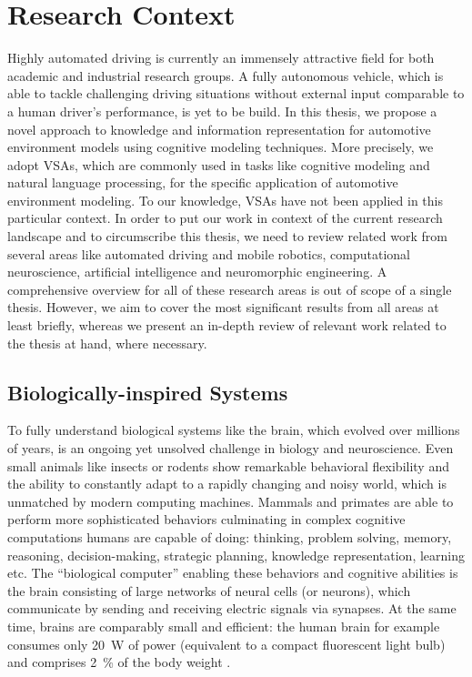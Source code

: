 \chapter{Research Context}%
\label{chap:research_context}

Highly automated driving is currently an immensely attractive field for both academic and industrial research groups.
A fully autonomous vehicle, which is able to tackle challenging driving situations without external input comparable to a human driver's performance, is yet to be build.
In this thesis, we propose a novel approach to knowledge and information representation for automotive environment models using cognitive modeling techniques.
More precisely, we adopt \acfp{VSA}, which are commonly used in tasks like cognitive modeling and natural language processing, for the specific application of automotive environment modeling.
To our knowledge, \acp{VSA} have not been applied in this particular context.
In order to put our work in context of the current research landscape and to circumscribe this thesis, we need to review related work from several areas like automated driving and mobile robotics, computational neuroscience, artificial intelligence and neuromorphic engineering.
A comprehensive overview for all of these research areas is out of scope of a single thesis.
However, we aim to cover the most significant results from all areas at least briefly, whereas we present an in-depth review of relevant work related to the thesis at hand, where necessary.

\section{Biologically-inspired Systems}
\label{sec:bio_systems}

To fully understand biological systems like the brain, which evolved over millions of years, is an ongoing yet unsolved challenge in biology and neuroscience.
Even small animals like insects or rodents show remarkable behavioral flexibility and the ability to constantly adapt to a rapidly changing and noisy world, which is unmatched by modern computing machines.
Mammals and primates are able to perform more sophisticated behaviors culminating in complex cognitive computations humans are capable of doing: thinking, problem solving, memory, reasoning, decision-making, strategic planning, knowledge representation, learning etc.
The \enquote{biological computer} enabling these behaviors and cognitive abilities is the brain consisting of large networks of neural cells (or neurons), which communicate by sending and receiving electric signals via synapses.
At the same time, brains are comparably small and efficient: the human brain for example consumes only \SI{20}{\watt} of power (equivalent to a compact fluorescent light bulb) and comprises \SI{2}{\percent} of the body weight \parencite[Chap. 2.1]{Eliasmith2013}. 

